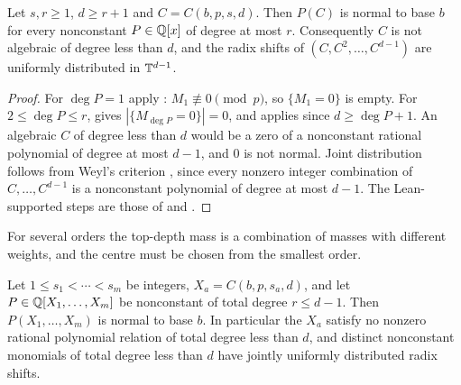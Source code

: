 \documentclass[11pt]{article}
\begin{document}
\begin{theorem}\label{thm:higher}
Let $s,r\ge1$, $d\ge r+1$ and $C=C(b,p,s,d)$. Then $P(C)$ is normal to base $b$ for every nonconstant
$P\in\mathbb Q[x]$ of degree at most $r$. Consequently $C$ is not algebraic of degree less than $d$, and the
radix shifts of $(C,C^2,\ldots,C^{d-1})$ are uniformly distributed in $\mathbb T^{d-1}$.
\end{theorem}

\begin{proof}
For $\deg P=1$ apply : $M_1\not\equiv0\pmod p$, so $\{M_1=0\}$ is empty. For $2\le\deg P\le r$,  gives
$|\{M_{\deg P}=0\}|=0$, and  applies since $d\ge\deg P+1$. An algebraic $C$ of degree
less than $d$ would be a zero of a nonconstant rational polynomial of degree at most $d-1$, and $0$ is
not normal. Joint distribution follows from Weyl's criterion \cite[Chapter~1, Theorem~6.2]{KN}, since every
nonzero integer combination of $C,\ldots,C^{d-1}$ is a nonconstant polynomial of degree at most $d-1$.
The Lean-supported steps are those of  and .
\end{proof}

For several orders the top-depth mass is a combination of masses with different weights, and the
centre must be chosen from the smallest order.

\begin{theorem}\label{thm:several}
Let $1\le s_1<\cdots<s_m$ be integers, $X_a=C(b,p,s_a,d)$, and let $P\in\mathbb Q[X_1,\ldots,X_m]$ be nonconstant of
total degree $r\le d-1$. Then $P(X_1,\ldots,X_m)$ is normal to base $b$. In particular the $X_a$ satisfy no
nonzero rational polynomial relation of total degree less than $d$, and distinct nonconstant monomials
of total degree less than $d$ have jointly uniformly distributed radix shifts.
\end{theorem}
\end{document}
